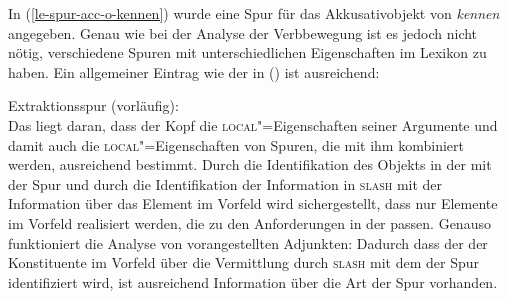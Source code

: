 \noindent
In (\ref{le-spur-acc-o-kennen}) wurde eine Spur für das Akkusativobjekt von \emph{kennen} angegeben.
Genau wie bei der Analyse der Verbbewegung ist es jedoch nicht nötig, verschiedene Spuren mit unterschiedlichen
Eigenschaften im Lexikon zu haben. Ein allgemeiner Eintrag wie der in () ist ausreichend:

\eas
\label{le-Extraktionsspur}%
Extraktionsspur (vorläufig): \\
\zs
Das liegt daran, dass der Kopf die \textsc{local}"=Eigenschaften seiner Argumente und damit auch die
\textsc{local}"=Eigenschaften von Spuren, die mit ihm kombiniert werden, ausreichend bestimmt. Durch
die Identifikation des Objekts in der \compsl mit der Spur und durch die Identifikation der
Information in \textsc{slash} mit der Information über das Element im Vorfeld wird sichergestellt,
dass nur Elemente im Vorfeld realisiert werden, die zu den Anforderungen in der \compsl
passen. Genauso funktioniert die Analyse von vorangestellten Adjunkten: Dadurch dass der
\localw der Konstituente im Vorfeld über die Vermittlung durch \textsc{slash} mit dem \localw der Spur
identifiziert wird, ist ausreichend Information über die Art der Spur vorhanden.


